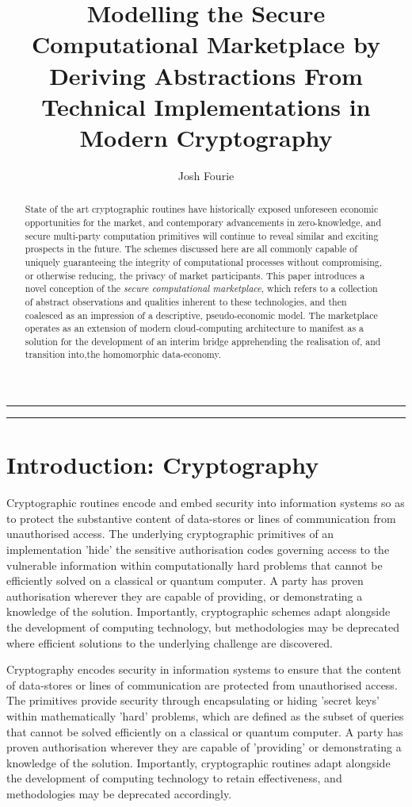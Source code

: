 \documentclass[twocolumn]{scrartcl}
\title{Modelling the Secure Computational Marketplace by Deriving Abstractions From Technical Implementations in Modern Cryptography}
\author{Josh Fourie}
\date{}
\begin{document}
\maketitle

\noindent \rule{7.08cm}{1pt}
\begin{abstract}
	State of the art cryptographic routines have historically exposed unforeseen economic opportunities for the market, and contemporary advancements in zero-knowledge, and secure multi-party computation primitives will continue to reveal similar and exciting prospects in the future. The schemes discussed here are all commonly capable of uniquely guaranteeing the integrity of computational processes without compromising, or otherwise reducing, the privacy of market participants. This paper introduces a novel conception of the \textit{secure computational marketplace}, which refers to a collection of abstract observations and qualities inherent to these technologies, and then coalesced as an impression of a descriptive, pseudo-economic model. The marketplace operates as an extension of modern cloud-computing architecture to manifest as a solution for the development of an interim bridge apprehending the realisation of, and transition into,the homomorphic data-economy.	
\end{abstract}
\noindent \rule{7.08cm}{0.5pt}

\section{Introduction: Cryptography}
Cryptographic routines encode and embed security into information systems so as to protect the substantive content of data-stores or lines of communication from unauthorised access. The underlying cryptographic primitives of an implementation 'hide' the sensitive authorisation codes governing access to the vulnerable information within computationally hard problems that cannot be efficiently solved on a classical or quantum computer. A party has proven authorisation wherever they are capable of providing, or demonstrating a knowledge of the solution. Importantly, cryptographic schemes adapt alongside the development of computing technology, but methodologies may be deprecated where efficient solutions to the underlying challenge are discovered.

Cryptography encodes security in information systems to ensure that the content of data-stores or lines of communication are protected from unauthorised access. The primitives provide security through encapsulating or hiding 'secret keys' within mathematically 'hard' problems, which are defined as the subset of queries that cannot be solved efficiently on a classical or quantum computer. A party has proven authorisation wherever they are capable of 'providing' or demonstrating a knowledge of the solution. Importantly, cryptographic routines adapt alongside the development of computing technology to retain effectiveness, and methodologies may be deprecated accordingly.
\end{document}
